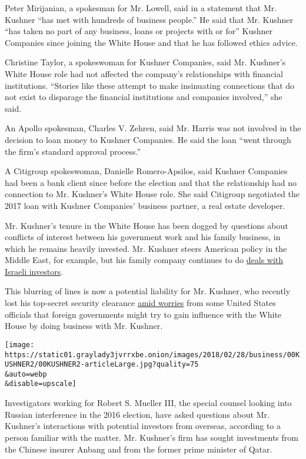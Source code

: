 Peter Mirijanian, a spokesman for Mr. Lowell, said in a statement that
Mr. Kushner ``has met with hundreds of business people.'' He said that
Mr. Kushner ``has taken no part of any business, loans or projects with
or for'' Kushner Companies since joining the White House and that he has
followed ethics advice.

Christine Taylor, a spokeswoman for Kushner Companies, said Mr.
Kushner's White House role had not affected the company's relationships
with financial institutions. ``Stories like these attempt to make
insinuating connections that do not exist to disparage the financial
institutions and companies involved,'' she said.

An Apollo spokesman, Charles V. Zehren, said Mr. Harris was not involved
in the decision to loan money to Kushner Companies. He said the loan
``went through the firm's standard approval process.''

A Citigroup spokeswoman, Danielle Romero-Apsilos, said Kushner Companies
had been a bank client since before the election and that the
relationship had no connection to Mr. Kushner's White House role. She
said Citigroup negotiated the 2017 loan with Kushner Companies' business
partner, a real estate developer.

Mr. Kushner's tenure in the White House has been dogged by questions
about conflicts of interest between his government work and his family
business, in which he remains heavily invested. Mr. Kushner steers
American policy in the Middle East, for example, but his family company
continues to do
\href{https://www.nytimes3xbfgragh.onion/2018/01/07/business/jared-kushner-israel.html}{deals
with Israeli investors}.

This blurring of lines is now a potential liability for Mr. Kushner, who
recently lost his top-secret security clearance
\href{https://www.nytimes3xbfgragh.onion/2018/02/27/us/politics/jared-kushner-security-clearance-trump.html}{amid
worries} from some United States officials that foreign governments
might try to gain influence with the White House by doing business with
Mr. Kushner.

\texttt{[image: https://static01.graylady3jvrrxbe.onion/images/2018/02/28/business/00KUSHNER2/00KUSHNER2-articleLarge.jpg?quality=75\\\&auto=webp\\\&disable=upscale]}

Investigators working for Robert S. Mueller III, the special counsel
looking into Russian interference in the 2016 election, have asked
questions about Mr. Kushner's interactions with potential investors from
overseas, according to a person familiar with the matter. Mr. Kushner's
firm has sought investments from the Chinese insurer Anbang and from the
former prime minister of Qatar.

